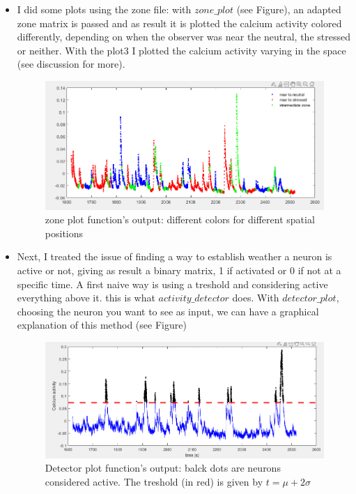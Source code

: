 \documentclass[a4paper]{article}
\begin{document}
\begin{itemize}
		\item I did some plots using the zone file: with \textit{$zone\_plot$} (see Figure), an adapted zone matrix is passed and as result it is plotted the calcium activity colored differently, depending on when the observer was near the neutral, the stressed or neither. With the plot3 I plotted the calcium activity varying in the space (see discussion for more).
		\begin{figure}[H]
			\begin{center}
				\includegraphics[scale=.60]{zone_plot.png} 
			\end{center} 
			\caption{zone plot function's output: different colors for different spatial positions}
		\end{figure}
		
		\item Next, I treated the issue of finding a way to establish weather a neuron is active or not, giving as result a binary matrix, 1 if activated or 0 if not at a specific time. A first naive way is using a treshold and considering active everything above it. this is what \textit{$activity\_detector$} does. With \textit{$detector\_plot$}, choosing the neuron you want to see as input, we can have a graphical explanation of this method (see Figure)
		
		\begin{figure}[H]
			\begin{center}
				\includegraphics[scale=.60]{detector_plot.png} 
			\end{center} 
			\caption{Detector plot function's output: balck dots are neurons considered active. The treshold (in red) is given by $t = \mu + 2 \sigma$}
		\end{figure}
		

\end{itemize}
\end{document}
